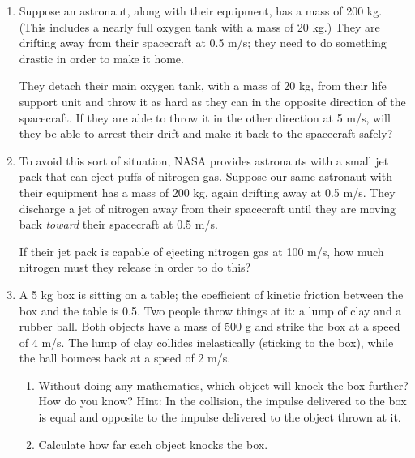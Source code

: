 \documentclass[12pt]{article}
\begin{document}
\newpage

\begin{enumerate}

\item Suppose an astronaut, along with their equipment, has a mass of 200 kg. (This includes a nearly full oxygen tank with a mass of 20 kg.) They are drifting away from their spacecraft at 0.5 m/s; they need to do something drastic in order to make it home.

They detach their main oxygen tank, with a mass of 20 kg, from their life support unit and throw it as hard as they can in the opposite direction of the spacecraft. If they are able to throw it in the other direction at 5 m/s, will they be able to arrest their drift and make it back to the spacecraft safely?

\vspace{2.8in}


\item To avoid this sort of situation, NASA provides astronauts with a small jet pack that can eject puffs of nitrogen gas. Suppose our same astronaut with their equipment has a mass of 200 kg, again drifting away at 0.5 m/s. They discharge a jet of nitrogen away from their spacecraft until they are moving back {\it toward} their spacecraft at 0.5 m/s.

If their jet pack is capable of ejecting nitrogen gas at 100 m/s, how much nitrogen must they release in order to do this? 

%
%

\newpage

\item{A 5 kg box is sitting on a table; the coefficient of kinetic friction between the box and the table is 0.5.
	Two people throw things at it: a lump of clay and a rubber ball. Both objects have a mass of 500 g and strike the box at a speed of 4 m/s. The lump of clay collides inelastically (sticking to the box), while the ball bounces back at a speed of 2 m/s.}
\begin{enumerate}
	\item{Without doing any mathematics, which object will knock the box further? How do you know? Hint: In the collision, the impulse delivered to the box is equal and opposite to the impulse delivered to the object thrown at it.}
	\vspace{2in}
	\item{Calculate how far each object knocks the box.}
\end{enumerate}



\end{enumerate}
\end{document}
